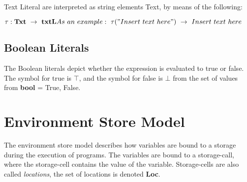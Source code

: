   
  Text Literal are interpreted as string elements Text, by means of the following:
  
  \begin{math}
  	\tau : \textbf{Txt} \ \rightarrow \ \textbf{txtL} \newline
  	As \ an \ example: \ \tau("Insert \ text \ here") \ \rightarrow \ Insert \ text \ here
  \end{math}
  
  \subsection{Boolean Literals}
  The Boolean literals depict whether the expression is evaluated to true or false. The symbol for true is \begin{math} \top \end{math}, and the symbol for false is \begin{math} \bot \end{math} from the set of values from \textbf{bool} = {True, False}.
  
  
  
  
  
  \section{Environment Store Model}
  The environment store model describes how variables are bound to a storage during the execution of programs. The variables are bound to a storage-call, where the storage-cell contains the value of the variable. Storage-cells are also called \textit{locations}, the set of locations is denoted \textbf{Loc}.
  
